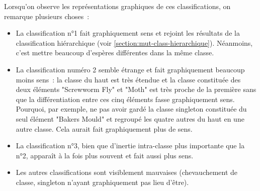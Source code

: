 \documentclass[a4paper,10pt]{report}
\begin{document}
Lorsqu'on observe les représentations graphiques de ces classifications, on remarque plusieurs choses~:
\begin{itemize}
	\item La classification n°1 fait graphiquement sens et rejoint les résultats de la classification hiérarchique (voir \autoref{section:mut-class-hierarchique}). Néanmoins, c'est mettre beaucoup d'espères différentes dans la même classe.
	\item La classification numéro 2 semble étrange et fait graphiquement beaucoup moins sens~: la classe du haut est très étendue et la classe constituée des deux éléments "Screwworm Fly" et "Moth" est très proche de la première sans que la différentiation entre ces cinq éléments fasse graphiquement sens. Pourquoi, par exemple, ne pas avoir gardé la classe singleton constituée du seul élément "Bakers Mould" et regroupé les quatre autres du haut en une autre classe. Cela aurait fait graphiquement plus de sens.
	\item La classification n°3, bien que d'inertie intra-classe plus importante que la n°2, apparaît à la fois plus souvent et fait aussi plus sens.
	\item Les autres classifications sont visiblement mauvaises (chevauchement de classe, singleton n'ayant graphiquement pas lieu d'être).
\end{itemize}
\end{document}
